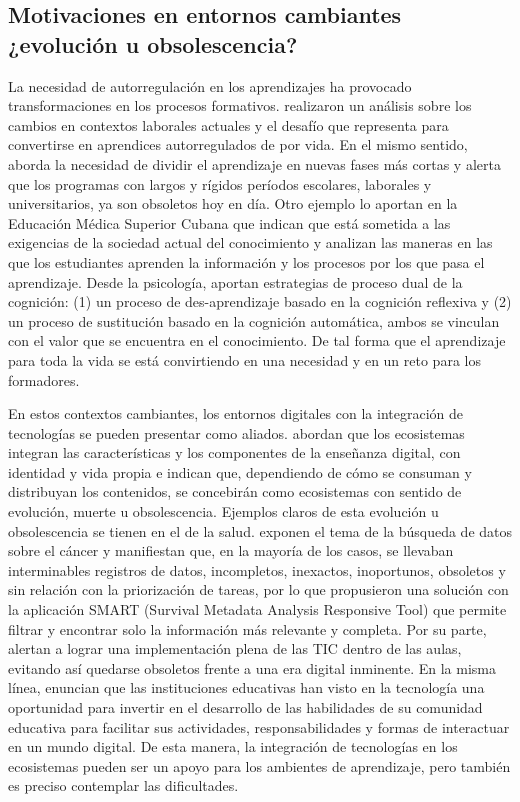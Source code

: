 \documentclass[spanish]{textolivre}
\begin{document}
\subsection{Motivaciones en entornos cambiantes ¿evolución u obsolescencia?}\label{sec-conduta}
La necesidad de autorregulación en los aprendizajes ha provocado transformaciones en los procesos formativos. \textcite{schwendimann_what_2018} realizaron un análisis sobre los cambios en contextos laborales actuales y el desafío que representa  para convertirse en aprendices autorregulados de por vida. En el mismo sentido, \textcite{kurjak_how_2016} aborda la necesidad de dividir el aprendizaje en nuevas fases más cortas y alerta que los programas con largos y rígidos períodos escolares, laborales y universitarios, ya son obsoletos hoy en día. Otro ejemplo lo aportan \textcite{diaz_quinones_fundamentos_2017} en la Educación Médica Superior Cubana que indican que está sometida a las exigencias de la sociedad actual del conocimiento y analizan las maneras en las que los estudiantes aprenden la información y los procesos por los que pasa el aprendizaje. Desde la psicología, \textcite{helfrich_how_2018} aportan estrategias de proceso dual de la cognición: (1) un proceso de des-aprendizaje basado en la cognición reflexiva y (2) un proceso de sustitución basado en la cognición automática, ambos se vinculan con el valor que se encuentra en el conocimiento. De tal forma que el aprendizaje para toda la vida se está convirtiendo en una necesidad y en un reto para los formadores.

En estos contextos cambiantes, los entornos digitales con la integración de tecnologías se pueden presentar como aliados. \textcite{islas_ecosistemas_2017} abordan que los ecosistemas integran las características y los componentes de la enseñanza digital, con identidad y vida propia e indican que, dependiendo de cómo se  consuman y distribuyan los contenidos, se concebirán como ecosistemas con sentido de evolución, muerte u obsolescencia. Ejemplos claros de esta evolución u obsolescencia se tienen en el de la salud. \textcite{chu_smart_2017} exponen el tema de la búsqueda de datos sobre el cáncer y manifiestan que, en la mayoría de los casos, se llevaban interminables registros de datos, incompletos, inexactos, inoportunos, obsoletos y sin relación con la priorización de tareas, por lo que propusieron una solución con la aplicación SMART (Survival Metadata Analysis Responsive Tool) que permite filtrar y encontrar solo la información más relevante y completa. Por su parte, \textcite{zagami_creating_2018} alertan a lograr una implementación plena de las TIC dentro de las aulas, evitando así quedarse obsoletos frente a una era digital inminente. En la misma línea, \textcite{canchola-gonzalez_concepto_2020} enuncian que las instituciones educativas han visto en la tecnología una oportunidad para invertir en el desarrollo de las habilidades de su comunidad educativa para facilitar sus actividades, responsabilidades y formas de interactuar en un mundo digital. De esta manera, la integración de tecnologías en los ecosistemas pueden ser un apoyo para los ambientes de aprendizaje, pero también es preciso contemplar las dificultades.  
\end{document}
